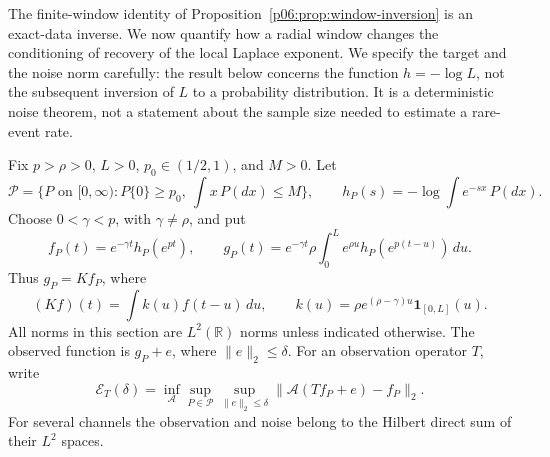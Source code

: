 \documentclass[11pt,letterpaper]{article}
\theoremstyle{definition}
\theoremstyle{remark}
\newcommand{\1}{\mathbf 1}
\begin{document}
The finite-window identity of
Proposition~\ref{p06:prop:window-inversion} is an exact-data inverse.
We now quantify how a radial window changes the conditioning of recovery
of the local Laplace exponent.  We specify the target and the noise norm
carefully: the result below concerns the function $h=-\log L$, not the
subsequent inversion of $L$ to a probability distribution.  It is a
deterministic noise theorem, not a statement about the sample size needed
to estimate a rare-event rate.

Fix $p>\rho>0$, $L>0$, $p_0\in(1/2,1)$, and $M>0$.  Let
\[
 \mathcal P=\{P\text{ on }[0,\infty):P\{0\}\ge p_0,
                       \ \int x\,P(dx)\le M\},
 \qquad h_P(s)=-\log\int e^{-sx}\,P(dx).
\]
Choose $0<\gamma<p$, with $\gamma\ne\rho$, and put
\begin{equation}\label{p07:eq:window-target}
 f_P(t)=e^{-\gamma t}h_P(e^{pt}),\qquad
 g_P(t)=e^{-\gamma t}\rho\int_0^L
                  e^{\rho u}h_P(e^{p(t-u)})\,du.
\end{equation}
Thus $g_P=Kf_P$, where
\begin{equation}\label{p07:eq:window-convolution}
 (Kf)(t)=\int k(u)f(t-u)\,du,
 \qquad k(u)=\rho e^{(\rho-\gamma)u}\mathbf1_{[0,L]}(u).
\end{equation}
All norms in this section are $L^2(\mathbb R)$ norms unless indicated
otherwise.  The observed function is $g_P+e$, where $\|e\|_2\le\delta$.
For an observation operator $T$, write
\begin{equation}\label{p07:eq:window-minimax}
 \mathcal E_T(\delta)=
 \inf_{\mathcal A}\sup_{P\in\mathcal P}
 \sup_{\|e\|_2\le\delta}
       \|\mathcal A(Tf_P+e)-f_P\|_2.
\end{equation}
For several channels the observation and noise belong to the Hilbert
direct sum of their $L^2$ spaces.
\end{document}
